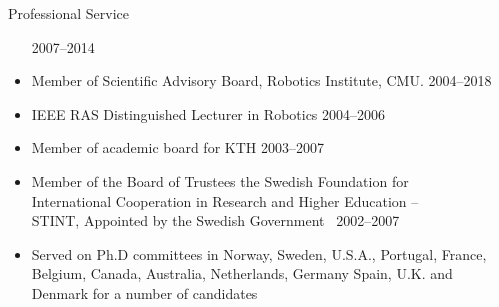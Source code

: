 \documentclass{article}
\begin{document}
\begin{cv}
\begin{cvlist}{Professional Service}
\begin{itemize}
			      \cftdotfill{\cftdotsep} 2007--2014
			\item Member of Scientific Advisory Board, Robotics Institute, CMU.\@
			      \cftdotfill{\cftdotsep} 2004--2018
			\item IEEE RAS Distinguished Lecturer in Robotics \cftdotfill{\cftdotsep}
			      2004--2006
			\item Member of academic board for KTH \cftdotfill{\cftdotsep} 2003--2007
			\item Member of the Board of Trustees the Swedish Foundation for\\
			      International Cooperation in Research and Higher Education --\\
			      STINT, Appointed by the Swedish Government\ \cftdotfill{\cftdotsep}
			      2002--2007
			\item Served on Ph.D committees in Norway, Sweden, U.S.A., Portugal, France,
			      Belgium, Canada, Australia, Netherlands, Germany Spain, U.K. and
			      Denmark for a number of candidates
		\end{itemize}	


\end{cvlist}
\end{cv}
\end{document}
